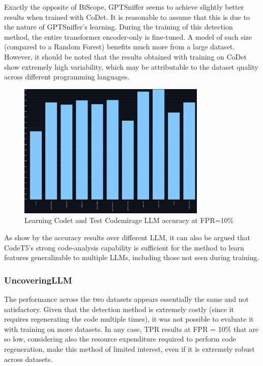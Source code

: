 Exactly the opposite of BiScope, GPTSniffer seems to achieve slightly 
better results when trained with CoDet. It is reasonable to assume that 
this is due to the nature of GPTSniffer’s learning. During the training 
of this detection method, the entire transformer encoder-only is fine-tuned. 
A model of such size (compared to a Random Forest) benefits much more 
from a large dataset. However, it should be noted that the results 
obtained with training on CoDet show extremely high variability, 
which may be attributable to the dataset quality across different 
programming languages.

\begin{figure}[H]
    \centering
    \includegraphics[width=0.8\textwidth]{img/TEST/CodeT5/CodetCodemirage/visualization(4).png}
    \caption{Learning Codet and Test Codemirage LLM accuracy at FPR=10\%}
    \label{fig:6}
\end{figure}

As show by the accuracy results over different LLM, 
it can also be argued that CodeT5’s strong code-analysis capability 
is sufficient for the method to learn features generalizable to multiple LLMs, 
including those not seen during training.
\subsubsection{UncoveringLLM}

The performance across the two datasets appears essentially the same and not 
satisfactory. Given that the detection method is extremely costly 
(since it requires regenerating the code multiple times), it was not possible 
to evaluate it with training on more datasets. In any case, TPR results at 
FPR = 10\% that are so low, considering also the resource expenditure 
required to perform code regeneration, make this method of limited 
interest, even if it is extremely robust across datasets.

